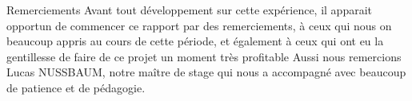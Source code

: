 \newline
\newline
\newline
\newline
\newline
\newline
\newline
\newline
\newline
\newline
\newline
\newline
\newline
\newline
\newline
Remerciements
\newline
\newline
Avant tout développement sur cette expérience, il apparait opportun de commencer ce rapport par des remerciements, à ceux qui nous on beaucoup appris au cours de cette période, et également à ceux qui ont eu la gentillesse de faire de ce projet un moment très profitable
\newline
\newline
Aussi nous remercions Lucas NUSSBAUM, notre maître de stage qui nous a accompagné avec beaucoup de patience et de pédagogie. 
